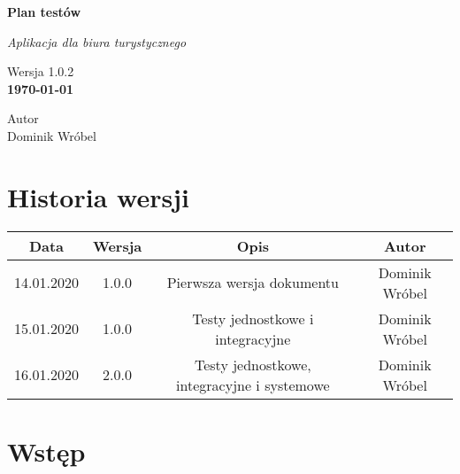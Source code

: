 \documentclass[a4paper,15pt]{article}
\begin{document}
\begin{titlepage}
   \begin{center}
       \vspace*{1cm}
 
       \LARGE{\textbf{Plan testów}}
 
       \vspace{0.5cm}
       \textit{Aplikacja dla biura turystycznego}
 
       \vspace{1.5cm}
 		
 	   Wersja 1.0.2 \\
       \textbf{\today}
 
       \vfill
 
 
       \vspace{0.8cm}
 
 		Autor \\
       Dominik Wróbel\\
       
       
   \end{center}
\end{titlepage}


\newpage
\tableofcontents



\newpage
\section{Historia wersji}

\begin{center}
 \begin{tabular}{||c c c c||} 
 \hline
 Data & Wersja & Opis & Autor \\ [0.5ex] 
 \hline\hline
 14.01.2020 & 1.0.0 & Pierwsza wersja dokumentu & Dominik Wróbel \\ 
 \hline
 15.01.2020 & 1.0.0 & Testy jednostkowe i integracyjne & Dominik Wróbel \\
 \hline
 16.01.2020 & 2.0.0 & Testy jednostkowe, integracyjne i systemowe & Dominik Wróbel \\ [1ex] 
 \hline
\end{tabular}
\end{center}

\section{Wstęp}
\end{document}
